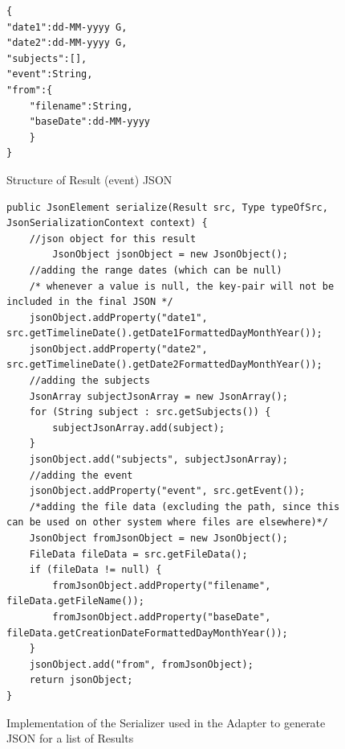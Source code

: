 \begin{figure}[h]
\begin{lstlisting}
{
"date1":dd-MM-yyyy G,
"date2":dd-MM-yyyy G,
"subjects":[],
"event":String,
"from":{
	"filename":String,
	"baseDate":dd-MM-yyyy
	}
}
\end{lstlisting}
\caption{Structure of Result (event) JSON}
\label{fig:jsonResult}
\end{figure}
\begin{figure}[H]
\begin{lstlisting}
public JsonElement serialize(Result src, Type typeOfSrc, JsonSerializationContext context) {
	//json object for this result
    	JsonObject jsonObject = new JsonObject();
	//adding the range dates (which can be null)
	/* whenever a value is null, the key-pair will not be included in the final JSON */
	jsonObject.addProperty("date1", src.getTimelineDate().getDate1FormattedDayMonthYear());
	jsonObject.addProperty("date2", src.getTimelineDate().getDate2FormattedDayMonthYear());
	//adding the subjects
	JsonArray subjectJsonArray = new JsonArray();
	for (String subject : src.getSubjects()) {
		subjectJsonArray.add(subject);
	}
	jsonObject.add("subjects", subjectJsonArray);
	//adding the event
	jsonObject.addProperty("event", src.getEvent());
	/*adding the file data (excluding the path, since this can be used on other system where files are elsewhere)*/
	JsonObject fromJsonObject = new JsonObject();
	FileData fileData = src.getFileData();
	if (fileData != null) {
		fromJsonObject.addProperty("filename", fileData.getFileName());
		fromJsonObject.addProperty("baseDate", fileData.getCreationDateFormattedDayMonthYear());
	}
	jsonObject.add("from", fromJsonObject);
	return jsonObject;
}
\end{lstlisting}
\caption{Implementation of the Serializer used in the Adapter to generate JSON for a list of Results}
\label{fig:adapterGsonImplemented}
\end{figure}

